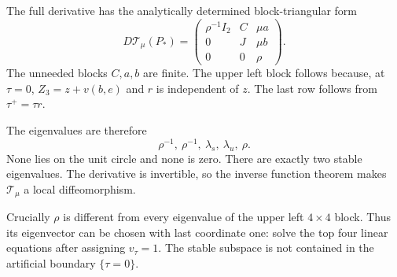 The full derivative has the analytically determined block-triangular form
\begin{equation}\label{L:eq:jacobian}
 D\mathcal T_\mu(P_*)=
 \begin{pmatrix}
 \rho^{-1}I_2&C&\mu a\\
 0&J&\mu b\\
 0&0&\rho
 \end{pmatrix}.
\end{equation}
The unneeded blocks $C,a,b$ are finite. The upper left block follows because, at $\tau=0$, $Z_3=z+v(b,e)$ and $r$ is independent of $z$. The last row follows from $\tau^+=\tau r$.

The eigenvalues are therefore
\[
 \rho^{-1},\ \rho^{-1},\ \lambda_s,\ \lambda_u,\ \rho.
\]
None lies on the unit circle and none is zero. There are exactly two stable eigenvalues. The derivative is invertible, so the inverse function theorem makes $\mathcal T_\mu$ a local diffeomorphism.

Crucially $\rho$ is different from every eigenvalue of the upper left $4\times4$ block. Thus its eigenvector can be chosen with last coordinate one: solve the top four linear equations after assigning $v_\tau=1$. The stable subspace is not contained in the artificial boundary $\{\tau=0\}$.


